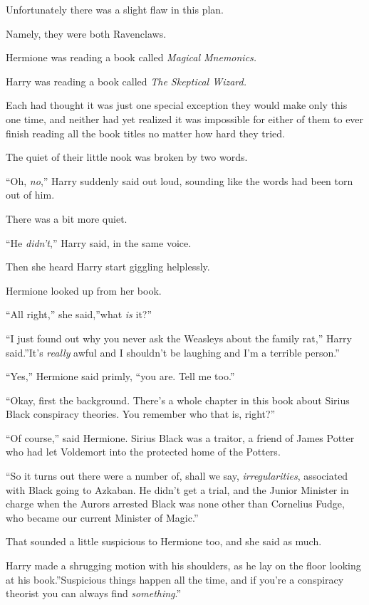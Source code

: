 Unfortunately there was a slight flaw in this plan.

Namely, they were both Ravenclaws.

Hermione was reading a book called \emph{Magical Mnemonics.}

Harry was reading a book called \emph{The Skeptical Wizard.}

Each had thought it was just one special exception they would make only
this one time, and neither had yet realized it was impossible for either
of them to ever finish reading all the book titles no matter how hard
they tried.

The quiet of their little nook was broken by two words.

``Oh, \emph{no},'' Harry suddenly said out loud, sounding like the words
had been torn out of him.

There was a bit more quiet.

``He \emph{didn't},'' Harry said, in the same voice.

Then she heard Harry start giggling helplessly.

Hermione looked up from her book.

``All right,'' she said,''what \emph{is} it?''

``I just found out why you never ask the Weasleys about the family
rat,'' Harry said.''It's \emph{really} awful and I shouldn't be laughing
and I'm a terrible person.''

``Yes,'' Hermione said primly, ``you are. Tell me too.''

``Okay, first the background. There's a whole chapter in this book about
Sirius Black conspiracy theories. You remember who that is, right?''

``Of course,'' said Hermione. Sirius Black was a traitor, a friend of
James Potter who had let Voldemort into the protected home of the
Potters.

``So it turns out there were a number of, shall we say,
\emph{irregularities}, associated with Black going to Azkaban. He didn't
get a trial, and the Junior Minister in charge when the Aurors arrested
Black was none other than Cornelius Fudge, who became our current
Minister of Magic.''

That sounded a little suspicious to Hermione too, and she said as much.

Harry made a shrugging motion with his shoulders, as he lay on the floor
looking at his book.''Suspicious things happen all the time, and if
you're a conspiracy theorist you can always find \emph{something}.''

